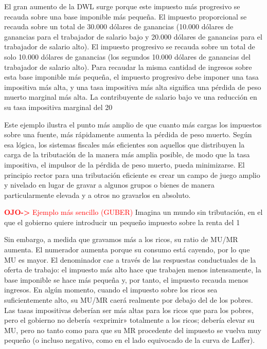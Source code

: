 \documentclass[10pt,a4paper]{article}
\begin{document}
El gran aumento de la DWL surge porque este impuesto más progresivo se recauda sobre una base imponible más pequeña. El impuesto proporcional se recauda sobre un total de 30.000 dólares de ganancias (10.000 dólares de ganancias para el trabajador de salario bajo y 20.000 dólares de ganancias para el trabajador de salario alto). El impuesto progresivo se recauda sobre un total de solo 10.000 dólares de ganancias (los segundos 10.000 dólares de ganancias del trabajador de salario alto). Para recaudar la misma cantidad de ingresos sobre esta base imponible más pequeña, el impuesto progresivo debe imponer una tasa impositiva más alta, y una tasa impositiva más alta significa una pérdida de peso muerto marginal más alta. La contribuyente de salario bajo ve una reducción en su tasa impositiva marginal del 20%

Este ejemplo ilustra el punto más amplio de que cuanto más cargas los impuestos sobre una fuente, más rápidamente aumenta la pérdida de peso muerto. Según esa lógica, los sistemas fiscales más eficientes son aquellos que distribuyen la carga de la tributación de la manera más amplia posible, de modo que la tasa impositiva, el impulsor de la pérdida de peso muerto, pueda minimizarse. El principio rector para una tributación eficiente es crear un campo de juego amplio y nivelado en lugar de gravar a algunos grupos o bienes de manera particularmente elevada y a otros no gravarlos en absoluto.


\textcolor{red}{\textbf{OJO-> }Ejemplo más sencillo (GUBER)}
Imagina un mundo sin tributación, en el que el gobierno quiere introducir un pequeño impuesto sobre la renta del 1%

Sin embargo, a medida que gravamos más a los ricos, su ratio de MU/MR aumenta. El numerador aumenta porque su consumo está cayendo, por lo que MU es mayor. El denominador cae a través de las respuestas conductuales de la oferta de trabajo: el impuesto más alto hace que trabajen menos intensamente, la base imponible se hace más pequeña y, por tanto, el impuesto recauda menos ingresos. En algún momento, cuando el impuesto sobre los ricos sea suficientemente alto, su MU/MR caerá realmente por debajo del de los pobres. Las tasas impositivas deberían ser más altas para los ricos que para los pobres, pero el gobierno no debería «exprimir» totalmente a los ricos; debería elevar su MU, pero no tanto como para que su MR procedente del impuesto se vuelva muy pequeño (o incluso negativo, como en el lado equivocado de la curva de Laffer).
\end{document}
